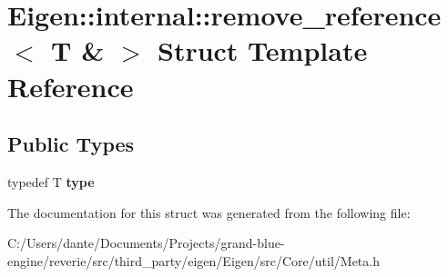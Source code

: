 \hypertarget{struct_eigen_1_1internal_1_1remove__reference_3_01_t_01_6_01_4}{}\section{Eigen\+::internal\+::remove\+\_\+reference$<$ T \& $>$ Struct Template Reference}
\label{struct_eigen_1_1internal_1_1remove__reference_3_01_t_01_6_01_4}
\subsection*{Public Types}
\begin{DoxyCompactItemize}
\item 
\mbox{\label{struct_eigen_1_1internal_1_1remove__reference_3_01_t_01_6_01_4_aee4fe49c1eaa98fb0fcc4c2144e40ece}} 
typedef T {\bfseries type}
\end{DoxyCompactItemize}


The documentation for this struct was generated from the following file\+:\begin{DoxyCompactItemize}
\item 
C\+:/\+Users/dante/\+Documents/\+Projects/grand-\/blue-\/engine/reverie/src/third\+\_\+party/eigen/\+Eigen/src/\+Core/util/Meta.\+h\end{DoxyCompactItemize}
